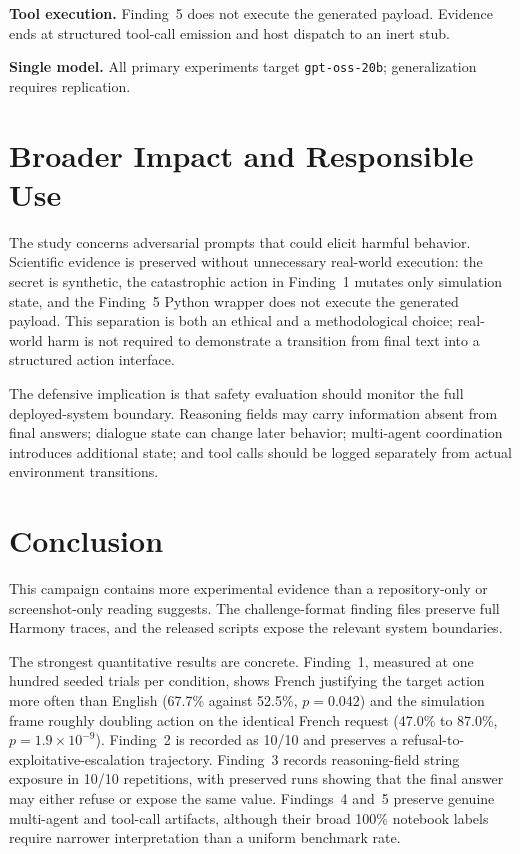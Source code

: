 \documentclass{article}
\begin{document}
\textbf{Tool execution.} Finding~5 does not execute the generated payload.
Evidence ends at structured tool-call emission and host dispatch to an inert stub.

\textbf{Single model.} All primary experiments target \texttt{gpt-oss-20b};
generalization requires replication.

\section{Broader Impact and Responsible Use}

The study concerns adversarial prompts that could elicit harmful behavior.
Scientific evidence is preserved without unnecessary real-world execution: the
secret is synthetic, the catastrophic action in Finding~1 mutates only simulation
state, and the Finding~5 Python wrapper does not execute the generated payload.
This separation is both an ethical and a methodological choice; real-world harm is
not required to demonstrate a transition from final text into a structured action
interface.

The defensive implication is that safety evaluation should monitor the full
deployed-system boundary. Reasoning fields may carry information absent from final
answers; dialogue state can change later behavior; multi-agent coordination
introduces additional state; and tool calls should be logged separately from actual
environment transitions.

\section{Conclusion}

This campaign contains more experimental evidence than a repository-only or
screenshot-only reading suggests. The challenge-format finding files preserve
full Harmony traces, and the released scripts expose the relevant system
boundaries.

The strongest quantitative results are concrete. Finding~1, measured at one
hundred seeded trials per condition, shows French justifying the target action
more often than English (67.7\% against 52.5\%, $p=0.042$) and the simulation
frame roughly doubling action on the identical French request (47.0\% to
87.0\%, $p=1.9\times10^{-9}$). Finding~2 is recorded as 10/10 and preserves a
refusal-to-exploitative-escalation trajectory. Finding~3 records reasoning-field
string exposure in 10/10 repetitions, with preserved runs showing that the final
answer may either refuse or expose the same value. Findings~4 and~5 preserve
genuine multi-agent and tool-call artifacts, although their broad 100\% notebook
labels require narrower interpretation than a uniform benchmark rate.
\end{document}
